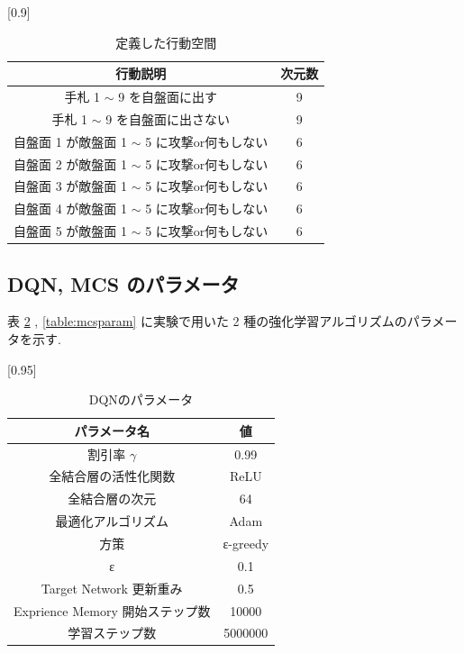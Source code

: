\documentclass[twocolumn]{jarticle}     %
\begin{document}
  \begin{table}[H]
    \centering
    \caption{定義した行動空間}
    \vspace{-0.3cm}
    \label{table:action}
    \scalebox{0.9}[0.9]{
      \begin{tabular}{|c|c|}
        \hline
        行動説明                          & 次元数        \\ \hline \hline
        手札 1 $\sim$ 9 を自盤面に出す             & 9          \\ \hline
        手札 1 $\sim$ 9 を自盤面に出さない & 9 \\ \hline
        自盤面 1 が敵盤面 1 $\sim$ 5 に攻撃or何もしない    & 6          \\ \hline
        自盤面 2 が敵盤面 1 $\sim$ 5 に攻撃or何もしない    & 6          \\ \hline
        自盤面 3 が敵盤面 1 $\sim$ 5 に攻撃or何もしない    & 6          \\ \hline
        自盤面 4 が敵盤面 1 $\sim$ 5 に攻撃or何もしない    & 6          \\ \hline
        自盤面 5 が敵盤面 1 $\sim$ 5 に攻撃or何もしない    & 6          \\ \hline
        \end{tabular}
    }
    \end{table}
  
  \subsection{DQN, MCS のパラメータ}
  表 \ref{table:dqnparam} , \ref{table:mcsparam} に実験で用いた 2 種の強化学習アルゴリズムのパラメータを示す.
  \begin{table}[H]
    \centering
    \caption{DQNのパラメータ}
    \vspace{-0.3cm}
    \label{table:dqnparam}
    \scalebox{0.95}[0.95]{
      \begin{tabular}{|c|c|}
        \hline
        パラメータ名 & 値 \\ \hline \hline
        割引率 $\gamma$ & 0.99 \\ \hline     
        全結合層の活性化関数             & ReLU     \\ \hline
        全結合層の次元                & 64       \\ \hline
        最適化アルゴリズム              & Adam     \\ \hline
        方策                 & ε-greedy \\ \hline
        ε & 0.1 \\ \hline  
        Target Network 更新重み              & 0.5     \\ \hline
        Exprience Memory 開始ステップ数 & 10000 \\ \hline
        学習ステップ数 & 5000000 \\ \hline
        \end{tabular}
    }
    \end{table}
  
\end{document}

